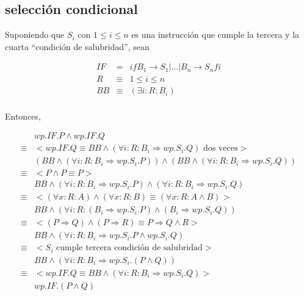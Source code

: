 \documentclass{article}
\begin{document}
\subsection{selección condicional}

Suponiendo que $S_i$ con $1 \leq i \leq n$ es una instrucción que
cumple la tercera y la cuarta ``condición de salubridad'',
sean

\begin{align*}
IF & = & if B_1 \rightarrow S_1 | \ldots | B_n \rightarrow S_n fi  \\
R & \equiv & 1 \leq i \leq n \\
BB & \equiv & (\exists i : R : B_i) \\
\end{align*}

Entonces,

\begin{align*}
 & wp.IF.P \wedge wp.IF.Q \\
 \equiv & <wp.IF.Q \equiv BB \wedge (\forall i : R : B_i \Rightarrow wp.S_i.Q) \text{ dos veces}> \\
 & (BB \wedge (\forall i : R : B_i \Rightarrow wp.S_i.P)) \wedge (BB \wedge (\forall i : R : B_i \Rightarrow wp.S_i.Q)) \\
 \equiv & <P \wedge P \equiv P> \\
 & BB \wedge (\forall i : R : B_i \Rightarrow wp.S_i.P) \wedge (\forall i : R : B_i \Rightarrow wp.S_i.Q) \\
 \equiv & <(\forall x : R : A) \wedge (\forall x : R : B) \equiv (\forall x : R : A \wedge B)> \\
 & BB \wedge (\forall i : R : (B_i \Rightarrow wp.S_i.P) \wedge (B_i \Rightarrow wp.S_i.Q)) \\
 \equiv & <(P \Rightarrow Q) \wedge (P \Rightarrow R) \equiv P \Rightarrow Q \wedge R> \\
 & BB \wedge (\forall i : R : B_i \Rightarrow wp.S_i.P \wedge wp.S_i.Q) \\
 \equiv & <S_i \text{ cumple tercera condición de salubridad}> \\
 & BB \wedge (\forall i : R : B_i \Rightarrow wp.S_i.(P \wedge Q)) \\
 \equiv & <wp.IF.Q \equiv BB \wedge (\forall i : R : B_i \Rightarrow wp.S_i.Q)> \\
 & wp.IF.(P \wedge Q)
\end{align*}
\end{document}
